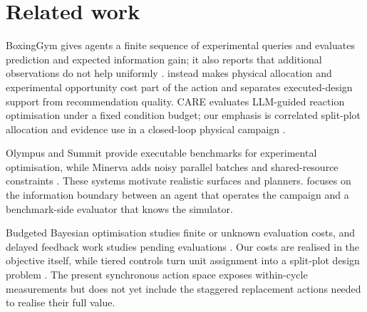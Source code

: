 \section{Related work}
\label{sec:related}

BoxingGym gives agents a finite sequence of experimental queries and evaluates prediction
and expected information gain; it also reports that additional observations do not help
uniformly \citep{boxinggym}. \slowlab{} instead makes physical allocation and experimental
opportunity cost part of the action and separates executed-design support from recommendation
quality. CARE evaluates LLM-guided reaction optimisation under a fixed condition budget;
our emphasis is correlated split-plot allocation and evidence use in a closed-loop physical
campaign \citep{care2026}.

Olympus and Summit provide executable benchmarks for experimental optimisation, while
Minerva adds noisy parallel batches and shared-resource constraints
\citep{olympus,summit,minerva}. These systems motivate realistic surfaces and planners.
\slowlab{} focuses on the information boundary between an agent that operates the campaign
and a benchmark-side evaluator that knows the simulator.

Budgeted Bayesian optimisation studies finite or unknown evaluation costs, and delayed
feedback work studies pending evaluations \citep{astudillo2021budgeted,verma2022delayed}.
Our costs are realised in the objective itself, while tiered controls turn unit assignment
into a split-plot design problem \citep{goos2011splitplot}. The present synchronous action
space exposes within-cycle measurements but does not yet include the staggered replacement
actions needed to realise their full value.
